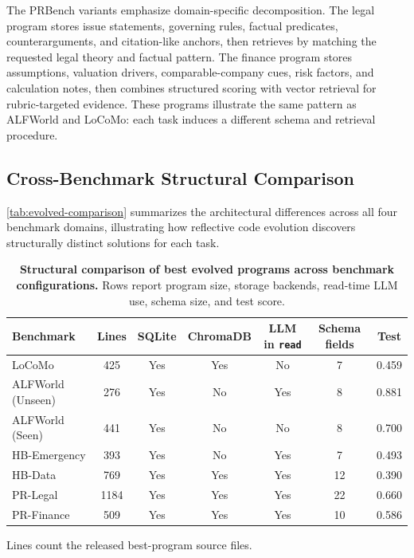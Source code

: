 The PRBench variants emphasize domain-specific decomposition.
The legal program stores issue statements, governing rules, factual predicates, counterarguments, and citation-like anchors, then retrieves by matching the requested legal theory and factual pattern.
The finance program stores assumptions, valuation drivers, comparable-company cues, risk factors, and calculation notes, then combines structured scoring with vector retrieval for rubric-targeted evidence.
These programs illustrate the same pattern as ALFWorld and LoCoMo: each task induces a different schema and retrieval procedure.

\subsection{Cross-Benchmark Structural Comparison}
\label{app:evolved-comparison}

\autoref{tab:evolved-comparison} summarizes the architectural differences across all four benchmark domains, illustrating how reflective code evolution discovers structurally distinct solutions for each task.

\begin{table}[!htbp]
\centering
\caption{\textbf{Structural comparison of best evolved programs across benchmark configurations.}
Rows report program size, storage backends, read-time LLM use, schema size, and test score.}
\label{tab:evolved-comparison}
\small
\setlength{\tabcolsep}{3pt}
\begin{tabular}{@{}lcccccc@{}}
\toprule
\textbf{Benchmark} & \textbf{Lines} & \textbf{SQLite} & \textbf{ChromaDB} & \textbf{LLM in \texttt{read}} & \textbf{Schema fields} & \textbf{Test} \\
\midrule
LoCoMo              & 425  & Yes & Yes & No  & 7  & 0.459 \\
ALFWorld (Unseen)   & 276  & Yes & No  & Yes & 8  & 0.881 \\
ALFWorld (Seen)     & 441  & Yes & No  & No  & 8  & 0.700 \\
HB-Emergency        & 393  & Yes & No  & Yes & 7  & 0.493 \\
HB-Data             & 769  & Yes & Yes & Yes & 12 & 0.390 \\
PR-Legal            & 1184 & Yes & Yes & Yes & 22 & 0.660 \\
PR-Finance          & 509  & Yes & Yes & Yes & 10 & 0.586 \\
\bottomrule
\end{tabular}
\vspace{0.3em}

{\footnotesize Lines count the released best-program source files.}
\end{table}

